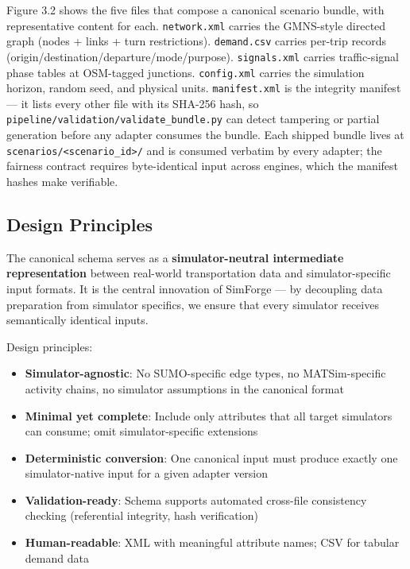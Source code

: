 Figure 3.2 shows the five files that compose a canonical scenario
bundle, with representative content for each. \texttt{network.xml}
carries the GMNS-style directed graph (nodes + links + turn
restrictions). \texttt{demand.csv} carries per-trip records
(origin/destination/departure/mode/purpose). \texttt{signals.xml}
carries traffic-signal phase tables at OSM-tagged junctions.
\texttt{config.xml} carries the simulation horizon, random seed, and
physical units. \texttt{manifest.xml} is the integrity manifest --- it
lists every other file with its SHA-256 hash, so
\texttt{pipeline/validation/validate\_bundle.py} can detect tampering or
partial generation before any adapter consumes the bundle. Each shipped
bundle lives at
\texttt{scenarios/\textless{}scenario\_id\textgreater{}/} and is
consumed verbatim by every adapter; the fairness contract requires
byte-identical input across engines, which the manifest hashes make
verifiable.

\subsection{Design Principles}\label{321-design-principles}

The canonical schema serves as a \textbf{simulator-neutral intermediate
representation} between real-world transportation data and
simulator-specific input formats. It is the central innovation of
SimForge --- by decoupling data preparation from simulator specifics, we
ensure that every simulator receives semantically identical inputs.

Design principles:

\begin{itemize}
\tightlist
\item
  \textbf{Simulator-agnostic}: No SUMO-specific edge types, no
  MATSim-specific activity chains, no simulator assumptions in the
  canonical format
\item
  \textbf{Minimal yet complete}: Include only attributes that all target
  simulators can consume; omit simulator-specific extensions
\item
  \textbf{Deterministic conversion}: One canonical input must produce
  exactly one simulator-native input for a given adapter version
\item
  \textbf{Validation-ready}: Schema supports automated cross-file
  consistency checking (referential integrity, hash verification)
\item
  \textbf{Human-readable}: XML with meaningful attribute names; CSV for
  tabular demand data
\end{itemize}

